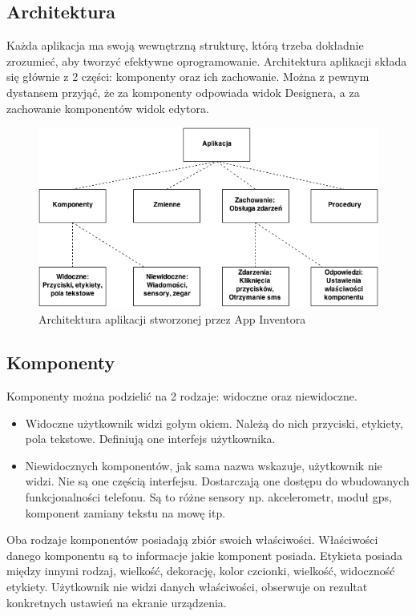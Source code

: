 \subsection{Architektura}
\label{c32}

Każda aplikacja ma swoją wewnętrzną strukturę, którą trzeba dokładnie zrozumieć, aby tworzyć efektywne oprogramowanie. Architektura aplikacji składa się głównie z 2 części: komponenty oraz ich zachowanie. Można z pewnym dystansem przyjąć, że za komponenty odpowiada widok Designera, a za zachowanie komponentów widok edytora.

\begin{figure}[th] 
\centering\includegraphics[width=12cm]{figures/architektura}
\caption{Architektura aplikacji stworzonej przez App Inventora\cite{appinventor:architektura}}
\end{figure}

\subsection{Komponenty}
\label{c321}

Komponenty można podzielić na 2 rodzaje: widoczne oraz niewidoczne. 
\begin{itemize}
\item Widoczne użytkownik widzi gołym okiem. Należą do nich przyciski, etykiety, pola tekstowe. Definiują one interfejs użytkownika.
\item Niewidocznych komponentów, jak sama nazwa wskazuje, użytkownik nie widzi. Nie są one częścią interfejsu. Dostarczają one dostępu do wbudowanych funkcjonalności telefonu. Są to różne sensory np. akcelerometr, moduł gps, komponent zamiany tekstu na mowę itp.
\end{itemize}

Oba rodzaje komponentów posiadają zbiór swoich właściwości. Właściwości danego komponentu są to informacje jakie komponent posiada. Etykieta posiada między innymi rodzaj, wielkość, dekorację, kolor czcionki, wielkość, widoczność etykiety. Użytkownik nie widzi danych właściwości, obserwuje on rezultat konkretnych ustawień na ekranie urządzenia.

